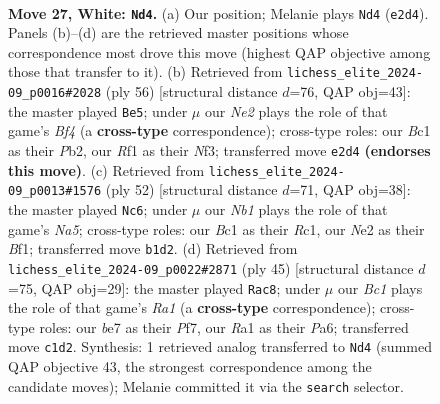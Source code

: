\documentclass[11pt]{article}
\begin{document}
\clearpage

\begin{figure}[p]\centering
\begin{subfigure}{0.46\textwidth}\centering
\resizebox{\linewidth}{!}{%
\newchessgame
\chessboard[
  setfen={rn3r2/1p1kb2p/4b1pP/p2pPp2/8/P5P1/4N1K1/RNB2R2 w - - 0 27},
  showmover=false,
  pgfstyle=straightmove, color=movearrow, markmove={e2-d4}
]}
\caption{}
\end{subfigure}\hfill
\begin{subfigure}{0.46\textwidth}\centering
\resizebox{\linewidth}{!}{%
\newchessgame
\chessboard[
  setfen={3r3k/pp3Bpp/5b2/5p2/b2p1B1P/P4N2/1P1R1PP1/6K1 w - - 5 29},
  showmover=false,
  pgfstyle=straightmove, color=movearrow, markmove={f4-e5}
]}
\caption{}
\end{subfigure}
\\[4pt]
\begin{subfigure}{0.46\textwidth}\centering
\resizebox{\linewidth}{!}{%
\newchessgame
\chessboard[
  setfen={1r4k1/7p/p7/N3rbp1/1n2pp2/1P6/P4PPP/2R1RBK1 w - - 3 27},
  showmover=false,
  pgfstyle=straightmove, color=movearrow, markmove={a5-c6}
]}
\caption{}
\end{subfigure}\hfill
\begin{subfigure}{0.46\textwidth}\centering
\resizebox{\linewidth}{!}{%
\newchessgame
\chessboard[
  setfen={r2r2k1/1p3ppp/p1n1b3/8/Pb1P4/N2RBP2/1R4PP/5BK1 b - - 4 23},
  showmover=false,
  pgfstyle=straightmove, color=movearrow, markmove={a8-c8}
]}
\caption{}
\end{subfigure}
\caption{\textbf{Move 27, White: \texttt{Nd4}.} (a) Our position; Melanie plays \texttt{Nd4} (\texttt{e2d4}). Panels (b)--(d) are the retrieved master positions whose correspondence most drove this move (highest QAP objective among those that transfer to it). (b) Retrieved from \texttt{lichess\_elite\_2024-09\_p0016\#2028} (ply 56) [structural distance $d$=76, QAP obj=43]: the master played \texttt{Be5}; under $\mu$ our \emph{Ne2} plays the role of that game's \emph{Bf4} (a \textbf{cross-type} correspondence); cross-type roles: our \emph{B}c1 as their \emph{P}b2, our \emph{R}f1 as their \emph{N}f3; transferred move \texttt{e2d4} \textbf{(endorses this move)}. (c) Retrieved from \texttt{lichess\_elite\_2024-09\_p0013\#1576} (ply 52) [structural distance $d$=71, QAP obj=38]: the master played \texttt{Nc6}; under $\mu$ our \emph{Nb1} plays the role of that game's \emph{Na5}; cross-type roles: our \emph{B}c1 as their \emph{R}c1, our \emph{N}e2 as their \emph{B}f1; transferred move \texttt{b1d2}. (d) Retrieved from \texttt{lichess\_elite\_2024-09\_p0022\#2871} (ply 45) [structural distance $d$=75, QAP obj=29]: the master played \texttt{Rac8}; under $\mu$ our \emph{Bc1} plays the role of that game's \emph{Ra1} (a \textbf{cross-type} correspondence); cross-type roles: our \emph{b}e7 as their \emph{P}f7, our \emph{R}a1 as their \emph{P}a6; transferred move \texttt{c1d2}. Synthesis: 1 retrieved analog transferred to \texttt{Nd4} (summed QAP objective 43, the strongest correspondence among the candidate moves); Melanie committed it via the \texttt{search} selector.}
\label{fig:thought-m52}
\end{figure}
\end{document}
